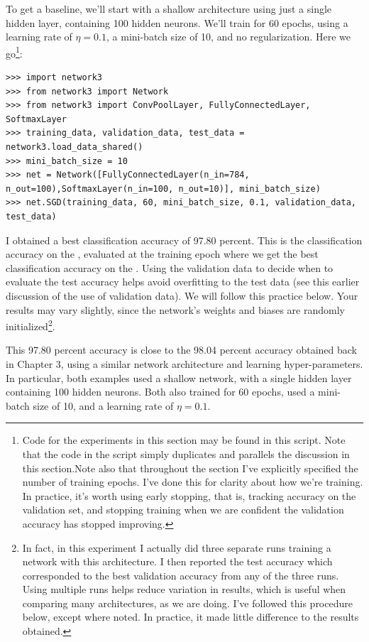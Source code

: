\documentclass[a4paper,twoside,10pt]{book}
\begin{document}
To get a baseline, we'll start with a shallow architecture using just a single hidden layer, containing 100 hidden neurons. We'll train for 60 epochs, using a learning rate of $\eta=0.1$, a mini-batch size of 10, and no regularization. Here we go\footnote{Code for the experiments in this section may be found in this script. Note that the code in the script simply duplicates and parallels the discussion in this section.\newline Note also that throughout the section I've explicitly specified the number of training epochs. I've done this for clarity about how we're training. In practice, it's worth using early stopping, that is, tracking accuracy on the validation set, and stopping training when we are confident the validation accuracy has stopped improving.}:
\begin{lstlisting}
>>> import network3
>>> from network3 import Network
>>> from network3 import ConvPoolLayer, FullyConnectedLayer, SoftmaxLayer
>>> training_data, validation_data, test_data = network3.load_data_shared()
>>> mini_batch_size = 10
>>> net = Network([FullyConnectedLayer(n_in=784, n_out=100),SoftmaxLayer(n_in=100, n_out=10)], mini_batch_size)
>>> net.SGD(training_data, 60, mini_batch_size, 0.1, validation_data, test_data)
\end{lstlisting}
I obtained a best classification accuracy of 97.80 percent. This is the classification accuracy on the , evaluated at the training epoch where we get the best classification accuracy on the . Using the validation data to decide when to evaluate the test accuracy helps avoid overfitting to the test data (see this earlier discussion of the use of validation data). We will follow this practice below. Your results may vary slightly, since the network's weights and biases are randomly initialized\footnote{In fact, in this experiment I actually did three separate runs training a network with this architecture. I then reported the test accuracy which corresponded to the best validation accuracy from any of the three runs. Using multiple runs helps reduce variation in results, which is useful when comparing many architectures, as we are doing. I've followed this procedure below, except where noted. In practice, it made little difference to the results obtained.}.

This 97.80 percent accuracy is close to the 98.04 percent accuracy obtained back in Chapter 3, using a similar network architecture and learning hyper-parameters. In particular, both examples used a shallow network, with a single hidden layer containing 100 hidden neurons. Both also trained for 60 epochs, used a mini-batch size of 10, and a learning rate of $\eta=0.1$.
\end{document}
